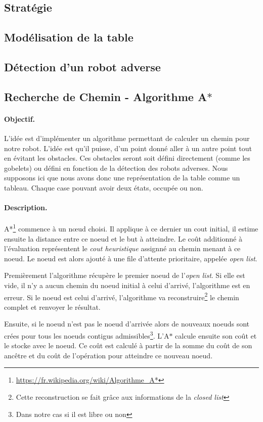 \documentclass[a4paper,10pt]{report}
\theoremstyle{definition}
\begin{document}
\begin{spacing}{1.5}
\section{Stratégie}
\subsection{Modélisation de la table}
\subsection{Détection d'un robot adverse}
\subsection{Recherche de Chemin - Algorithme A$\ast$}
\paragraph{Objectif.} L'idée est d'implémenter un algorithme permettant de
calculer un chemin pour notre robot. L'idée est qu'il puisse, d'un point donné
aller à un autre point tout en évitant les obstacles. Ces obstacles seront soit
défini directement (comme les gobelets) ou défini en fonction de la détection
des robots adverses. Nous supposons ici que nous avons donc une représentation
de la table comme un tableau. Chaque case pouvant avoir deux états, occupée ou
non.
\paragraph{Description.}
A*\footnote{\url{https://fr.wikipedia.org/wiki/Algorithme_A*}} commence à un
nœud choisi. Il applique à ce dernier un cout initial, il estime ensuite la
distance entre ce noeud et le but à atteindre. Le coût additionné à l'évaluation
représentent le \textit{cout heuristique} assignné au chemin menant à ce noeud.
Le noeud est alors ajouté à une file d'attente prioritaire, appelée \textit{open
list}.

Premièrement l'algorithme récupère le premier noeud de l'\textit{open list}. Si
elle est vide, il n'y a aucun chemin du noeud initial à celui d'arrivé,
l'algorithme est en erreur. Si le noeud est celui d'arrivé, l'algorithme va
reconstruire\footnote{Cette reconstruction se fait grâce aux informations de la
  \textit{closed list}} le chemin complet et renvoyer le résultat.

Ensuite, si le noeud n'est pas le noeud d'arrivée alors de nouveaux noeuds sont
crées pour tous les noeuds contigus admissibles\footnote{Dans notre cas si il
  est libre ou non}. L'A$\ast$ calcule ensuite son coût et le stocke avec le
noeud. Ce coût est calculé à partir de la somme du coût de son ancêtre et du
coût de l'opération pour atteindre ce nouveau noeud.


\end{spacing}
\end{document}
